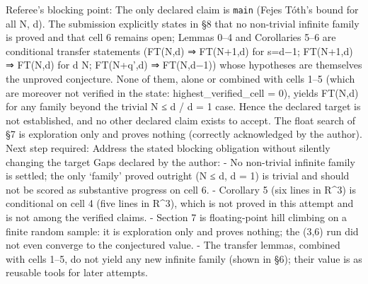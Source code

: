 Referee's blocking point: The only declared claim is \texttt{main}
(Fejes Tóth's bound for all N, d). The submission explicitly states in
§8 that no non-trivial infinite family is proved and that cell 6 remains
open; Lemmas 0--4 and Corollaries 5--6 are conditional transfer
statements (FT(N,d) ⇒ FT(N+1,d) for s=d−1; FT(N+1,d) ⇒ FT(N,d) for d
\textbar{} N; FT(N+q',d) ⇒ FT(N,d−1)) whose hypotheses are themselves
the unproved conjecture. None of them, alone or combined with cells 1--5
(which are moreover not verified in the state: highest\_verified\_cell =
0), yields FT(N,d) for any family beyond the trivial N ≤ d / d = 1 case.
Hence the declared target is not established, and no other declared
claim exists to accept. The float search of §7 is exploration only and
proves nothing (correctly acknowledged by the author). Next step
required: Address the stated blocking obligation without silently
changing the target Gaps declared by the author: - No non-trivial
infinite family is settled; the only `family' proved outright (N ≤ d, d
= 1) is trivial and should not be scored as substantive progress on cell
6. - Corollary 5 (six lines in R\^{}3) is conditional on cell 4 (five
lines in R\^{}3), which is not proved in this attempt and is not among
the verified claims. - Section 7 is floating-point hill climbing on a
finite random sample: it is exploration only and proves nothing; the
(3,6) run did not even converge to the conjectured value. - The transfer
lemmas, combined with cells 1--5, do not yield any new infinite family
(shown in §6); their value is as reusable tools for later attempts.

